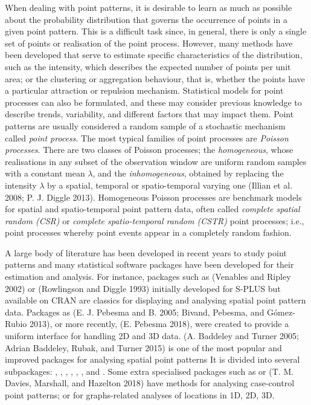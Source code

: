 When dealing with point patterns, it is desirable to learn as much as possible about the probability distribution that governs the occurrence of points in a given point pattern. This is a difficult task since, in general, there is only a single set of points or realisation of the point process. However, many methods have been developed that serve to estimate specific characteristics of the distribution, such as the intensity, which describes the expected number of points per unit area; or the clustering or aggregation behaviour, that is, whether the points have a particular attraction or repulsion mechanism. Statistical models for point processes can also be formulated, and these may consider previous knowledge to describe trends, variability, and different factors that may impact them. Point patterns are usually considered a random sample of a stochastic mechanism called \emph{point process}. The most typical families of point processes are \emph{Poisson processes}. There are two classes of Poisson processes; the \emph{homogeneous}, whose realisations in any subset of the observation window are uniform random samples with a constant mean \(\lambda\), and the \emph{inhomogeneous}, obtained by replacing the intensity \(\lambda\) by a spatial, temporal or spatio-temporal varying one (Illian et al. 2008; P. J. Diggle 2013). Homogeneous Poisson processes are benchmark models for spatial and spatio-temporal point pattern data, often called \emph{complete spatial random (CSR)} or \emph{complete spatio-temporal random (CSTR)} point processes; i.e., point processes whereby point events appear in a completely random fashion.

A large body of literature has been developed in recent years to study point patterns and many statistical software packages have been developed for their estimation and analysis. For instance, packages such as  (Venables and Ripley 2002) or  (Rowlingson and Diggle 1993) initially developed for S-PLUS but available on CRAN are classics for displaying and analysing spatial point pattern data. Packages as  (E. J. Pebesma and B. 2005; Bivand, Pebesma, and Gómez-Rubio 2013), or more recently,  (E. Pebesma 2018), were created to provide a uniform interface for handling 2D and 3D data.  (A. Baddeley and Turner 2005; Adrian Baddeley, Rubak, and Turner 2015) is one of the most popular and improved packages for analysing spatial point patterns It is divided into several subpackages: , , , , , ,  and . Some extra specialised packages such as  or  (T. M. Davies, Marshall, and Hazelton 2018) have methods for analysing case-control point patterns; or  for graphs-related analyses of locations in 1D, 2D, 3D.

